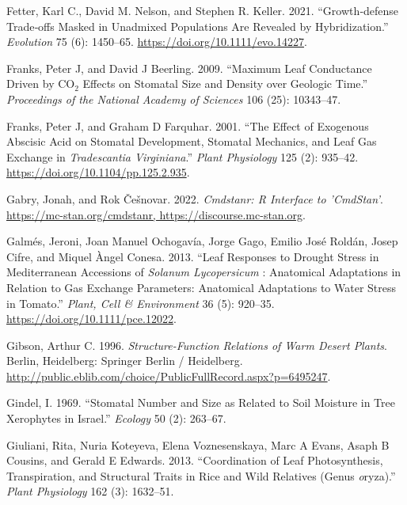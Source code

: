 \documentclass[
  12pt,
]{article}
\newlength{\cslhangindent}
\newlength{\cslentryspacingunit} %
\newenvironment{CSLReferences}[2] %
 {%
  \setlength{\parindent}{0pt}
  \ifodd #1
  \let\oldpar\par
  \def\par{\hangindent=\cslhangindent\oldpar}
  \fi
  \setlength{\parskip}{#2\cslentryspacingunit}
 }%
 {}
\begin{document}
\begin{CSLReferences}{1}{0}
\leavevmode{}%
Fetter, Karl C., David M. Nelson, and Stephen R. Keller. 2021. {``Growth‐defense Trade‐offs Masked in Unadmixed Populations Are Revealed by Hybridization.''} \emph{Evolution} 75 (6): 1450--65. \url{https://doi.org/10.1111/evo.14227}.

\leavevmode{}%
Franks, Peter J, and David J Beerling. 2009. {``Maximum Leaf Conductance Driven by {CO}\(_{\textrm{2}}\) Effects on Stomatal Size and Density over Geologic Time.''} \emph{Proceedings of the National Academy of Sciences} 106 (25): 10343--47.

\leavevmode{}%
Franks, Peter J, and Graham D Farquhar. 2001. {``The {Effect} of {Exogenous} {Abscisic} {Acid} on {Stomatal} {Development}, {Stomatal} {Mechanics}, and {Leaf} {Gas} {Exchange} in \emph{{Tradescantia} Virginiana}.''} \emph{Plant Physiology} 125 (2): 935--42. \url{https://doi.org/10.1104/pp.125.2.935}.

\leavevmode{}%
Gabry, Jonah, and Rok Češnovar. 2022. \emph{Cmdstanr: {R} {Interface} to '{CmdStan}'}. \href{https://mc-stan.org/cmdstanr,\%20https://discourse.mc-stan.org}{https://mc-stan.org/cmdstanr, https://discourse.mc-stan.org}.

\leavevmode{}%
Galmés, Jeroni, Joan Manuel Ochogavía, Jorge Gago, Emilio José Roldán, Josep Cifre, and Miquel Àngel Conesa. 2013. {``Leaf Responses to Drought Stress in {Mediterranean} Accessions of \emph{{Solanum} Lycopersicum} : Anatomical Adaptations in Relation to Gas Exchange Parameters: {Anatomical} Adaptations to Water Stress in Tomato.''} \emph{Plant, Cell \& Environment} 36 (5): 920--35. \url{https://doi.org/10.1111/pce.12022}.

\leavevmode{}%
Gibson, Arthur C. 1996. \emph{Structure-{Function} {Relations} of {Warm} {Desert} {Plants}}. Berlin, Heidelberg: Springer Berlin / Heidelberg. \url{http://public.eblib.com/choice/PublicFullRecord.aspx?p=6495247}.

\leavevmode{}%
Gindel, I. 1969. {``Stomatal Number and Size as Related to Soil Moisture in Tree Xerophytes in {Israel}.''} \emph{Ecology} 50 (2): 263--67.

\leavevmode{}%
Giuliani, Rita, Nuria Koteyeva, Elena Voznesenskaya, Marc A Evans, Asaph B Cousins, and Gerald E Edwards. 2013. {``Coordination of Leaf Photosynthesis, Transpiration, and Structural Traits in Rice and Wild Relatives (Genus \emph{o}ryza).''} \emph{Plant Physiology} 162 (3): 1632--51.


\end{CSLReferences}
\end{document}
